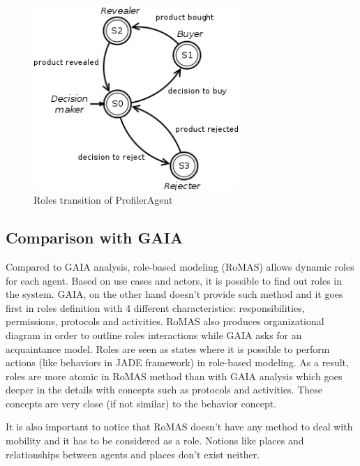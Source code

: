 \documentclass[a4paper,11pt]{report}
\begin{document}
  \begin{figure}[ht!]
    \centering
    \includegraphics[height=7cm]{media/role_transition_proa.png}
    \caption{Roles transition of ProfilerAgent}
    \label{figure:role_transition_proa}
  \end{figure}

  \subsection{Comparison with GAIA}

  Compared to GAIA analysis, role-based modeling (RoMAS) allows dynamic roles 
  for each agent. Based on use cases and actors, it is possible to find out 
  roles in the system. GAIA, on the other hand doesn't provide such method and 
  it goes first in roles definition with 4 different characteristics: responsibilities, 
  permissions, protocols and activities. RoMAS also produces organizational 
  diagram in order to outline roles interactions while GAIA asks for an acquaintance 
  model. Roles are seen as states where it is possible to perform actions (like 
  behaviors in JADE framework) in role-based modeling. As a result, roles are more 
  atomic in RoMAS method than with GAIA analysis which goes deeper in the details with 
  concepts such as protocols and activities. These concepts are very close (if not 
  similar) to the behavior concept.
  
  It is also important to notice that RoMAS doesn't have any method to deal with mobility 
  and it has to be considered as a role. Notions like places and relationships between 
  agents and places don't exist neither.
  
\end{document}
